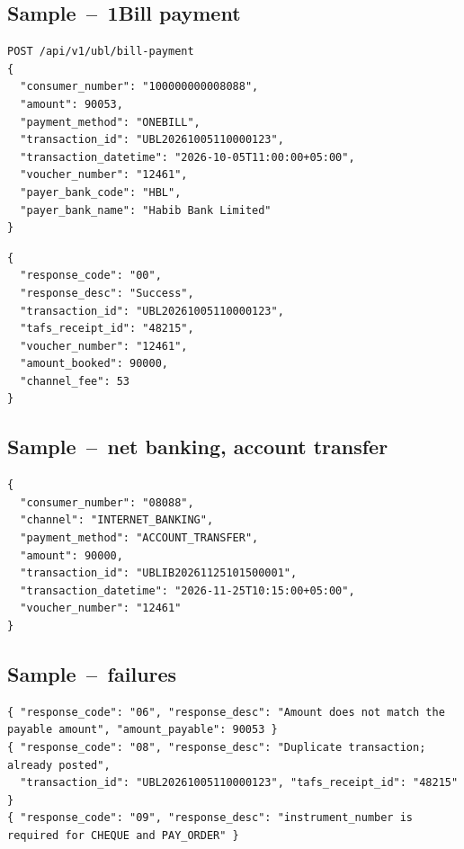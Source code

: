 \documentclass[11pt]{article}
\begin{document}
\subsection{Sample \,--\, 1Bill payment}
\begin{lstlisting}
POST /api/v1/ubl/bill-payment
{
  "consumer_number": "100000000008088",
  "amount": 90053,
  "payment_method": "ONEBILL",
  "transaction_id": "UBL20261005110000123",
  "transaction_datetime": "2026-10-05T11:00:00+05:00",
  "voucher_number": "12461",
  "payer_bank_code": "HBL",
  "payer_bank_name": "Habib Bank Limited"
}
\end{lstlisting}
\begin{lstlisting}
{
  "response_code": "00",
  "response_desc": "Success",
  "transaction_id": "UBL20261005110000123",
  "tafs_receipt_id": "48215",
  "voucher_number": "12461",
  "amount_booked": 90000,
  "channel_fee": 53
}
\end{lstlisting}

\subsection{Sample \,--\, net banking, account transfer}
\begin{lstlisting}
{
  "consumer_number": "08088",
  "channel": "INTERNET_BANKING",
  "payment_method": "ACCOUNT_TRANSFER",
  "amount": 90000,
  "transaction_id": "UBLIB20261125101500001",
  "transaction_datetime": "2026-11-25T10:15:00+05:00",
  "voucher_number": "12461"
}
\end{lstlisting}

\subsection{Sample \,--\, failures}
\begin{lstlisting}
{ "response_code": "06", "response_desc": "Amount does not match the payable amount", "amount_payable": 90053 }
{ "response_code": "08", "response_desc": "Duplicate transaction; already posted",
  "transaction_id": "UBL20261005110000123", "tafs_receipt_id": "48215" }
{ "response_code": "09", "response_desc": "instrument_number is required for CHEQUE and PAY_ORDER" }
\end{lstlisting}
\end{document}
